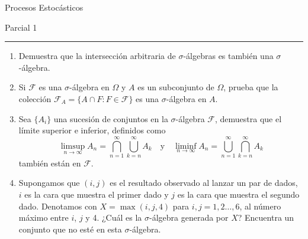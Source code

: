 \documentclass{report}
\begin{document}
\begin{center}
    \textsf{\Large Procesos Estocásticos}
    \par\medskip
    \textsf{\large Parcial 1}
\end{center}
\hrule
\par\bigskip

\begin{enumerate}
    \item Demuestra que la intersección arbitraria de $\sigma$-álgebras es también una $\sigma$-álgebra.
    \item Si $\mathcal{F}$ es una $\sigma$-álgebra en $\Omega$ y $A$ es un subconjunto de $\Omega$, prueba que la colección $\mathcal{F}_A = \{A \cap F : F \in \mathcal{F}\}$ es una $\sigma$-álgebra en $A$.
    \item Sea $\{A_i\}$ una sucesión de conjuntos en la $\sigma$-álgebra $\mathcal{F}$, demuestra que el límite superior e inferior, definidos como 
    $$
        \limsup_{n\rightarrow \infty}A_n = \bigcap_{n=1}^\infty\bigcup_{k=n}^\infty A_k \quad\text{y}\quad \liminf_{n\rightarrow \infty} A_n =      \bigcup_{n=1}^{\infty}\bigcap_{k=n}^\infty A_k
    $$
    también están en $\mathcal{F}$.
    \item Supongamos que $(i,j)$ es el resultado observado al lanzar un par de dados, $i$ es la cara que muestra el primer dado y $j$ es la cara que muestra el segundo dado. Denotamos con $X = \max(i,j,4)$ para $i,j=1,2\ldots,6$, al número máximo entre $i$, $j$ y 4. ¿Cuál es la $\sigma$-álgebra generada por $X$? Encuentra un conjunto que no esté en esta $\sigma$-álgebra.

\end{enumerate}
\end{document}
